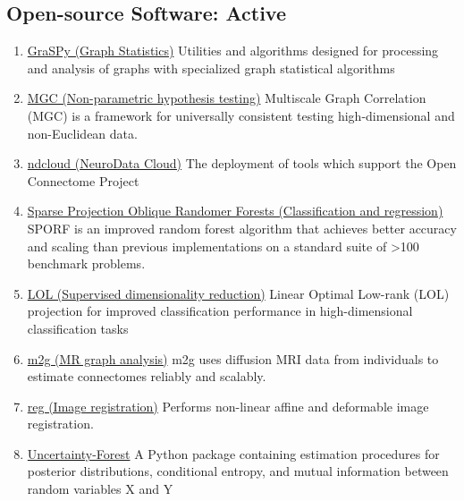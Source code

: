 \documentclass[10pt,colorlinks=true,urlcolor=blue]{moderncv}
\begin{document}
\subsection{Open-source Software: Active}

\begin{enumerate}
    \item \href{https://neurodata.io/graspy/}{GraSPy (Graph Statistics)} Utilities and algorithms designed for processing and analysis of graphs with specialized graph statistical algorithms
    \item \href{https://neurodata.io/mgc/}{MGC (Non-parametric hypothesis testing)} Multiscale Graph Correlation (MGC) is a framework for universally consistent testing high-dimensional and non-Euclidean data.
    \item \href{https://neurodata.io/nd_cloud/}{ndcloud (NeuroData Cloud)} The deployment of tools which support the Open Connectome Project
    \item \href{https://neurodata.io/sporf/}{Sparse Projection Oblique Randomer Forests (Classification and regression)} SPORF is an improved random forest algorithm that achieves better accuracy and scaling than previous implementations on a standard suite of >100 benchmark problems.
    \item \href{https://neurodata.io/lol/}{LOL (Supervised dimensionality reduction)} Linear Optimal Low-rank (LOL) projection for improved classification performance in high-dimensional classification tasks
    \item \href{https://neurodata.io/m2g/}{m2g (MR graph analysis)} m2g uses diffusion MRI data from individuals to estimate connectomes reliably and scalably.
    \item \href{https://neurodata.io/reg/}{reg (Image registration)} Performs non-linear affine and deformable image registration.

    \item \href{https://github.com/neurodata/uncertainty-forest}{Uncertainty-Forest} A Python package containing estimation procedures for posterior distributions, conditional entropy, and mutual information between random variables X and Y


\end{enumerate}
\end{document}
